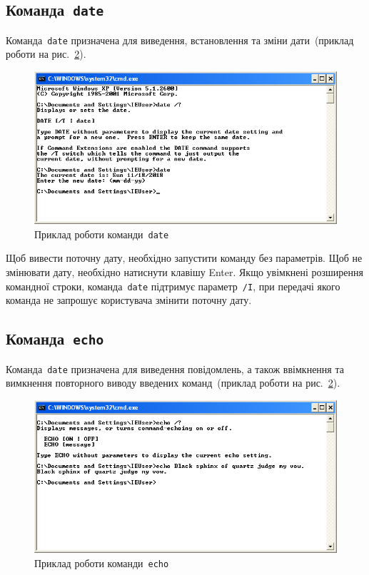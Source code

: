 \documentclass[
	a4paper,
	oneside,
	DIV = 12,
	fontsize = 13pt,
	headings = normal,
]{scrartcl}
\newcommand{\progname}[1]{\texttt{#1}}
\begin{document}
		\subsection{Команда~\progname{date}}
			Команда~\progname{date} призначена для виведення, встановлення та зміни дати~(приклад роботи на рис.~\ref{fig:echo-usage}).

			\begin{figure}[!htbp]
				\centering
				\includegraphics[height = 6\baselineskip]{../01-solution/y03s01-pcdiag-lab-06-p01.png}
				\caption{Приклад роботи команди~\progname{date}}
				\label{fig:date-usage}
			\end{figure}

			Щоб вивести поточну дату, необхідно запустити команду без параметрів. Щоб не змінювати дату, необхідно натиснути клавішу \textenglish{Enter}. Якщо увімкнені розширення командної строки, команда~\progname{date} підтримує параметр~\texttt{/I}, при передачі якого команда не запрошує користувача змінити поточну дату.

		\subsection{Команда~\progname{echo}}
			Команда~\progname{date} призначена для виведення повідомлень, а також ввімкнення та вимкнення повторного виводу введених команд~(приклад роботи на рис.~\ref{fig:echo-usage}).

			\begin{figure}[!htbp]
				\centering
				\includegraphics[height = 6\baselineskip]{../01-solution/y03s01-pcdiag-lab-06-p02.png}
				\caption{Приклад роботи команди~\progname{echo}}
				\label{fig:echo-usage}
			\end{figure}
\end{document}
